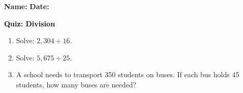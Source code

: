 \documentclass[12pt, letterpaper, fleqn]{article}
\begin{document}
\textbf{Name:} \underline{\hspace{5cm}}
\hfill
\textbf{Date:} \underline{\hspace{3cm}}\\

\begin{tcolorbox}[colback=customteal!20]
    \large\textcolor{black}{\textbf{Quiz: Division}}
\end{tcolorbox}
\begin{enumerate}[itemsep=3.5cm, leftmargin=0.6cm]
\item Solve: $2,304 \div 16$.
\vspace{3.5cm}
\item Solve: $5,675 \div 25$.
\vspace{3.5cm}
\item A school needs to transport 350 students on buses. If each bus holds 45 students, how many buses are needed?
\end{enumerate}
\end{document}

